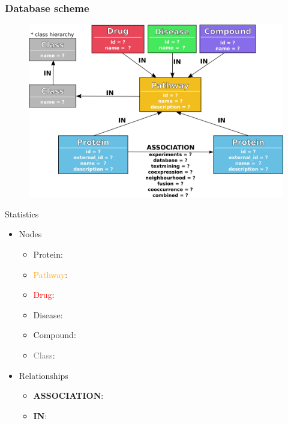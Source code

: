 \documentclass{beamer}
\begin{document}
\begin{frame}
\frametitle{Database scheme}
\begin{figure}
    \centering
    \includegraphics[width=0.9\linewidth]{database_scheme.png}
\end{figure}
\end{frame}


\begin{frame}{Statistics}
\begin{itemize}
    \item Nodes
    \begin{itemize}
        \item \textcolor{protein}{Protein}:
        \item \textcolor{orange}{Pathway}:
        \item \textcolor{red}{Drug}:
        \item \textcolor{disease}{Disease}:
        \item \textcolor{compound}{Compound}:
        \item \textcolor{gray}{Class}:
    \end{itemize}
    \vfill
    \item Relationships
    \begin{itemize}
        \item \textbf{ASSOCIATION}:
        \item \textbf{IN}:
    \end{itemize}
\end{itemize}
\end{frame}

\end{document}
